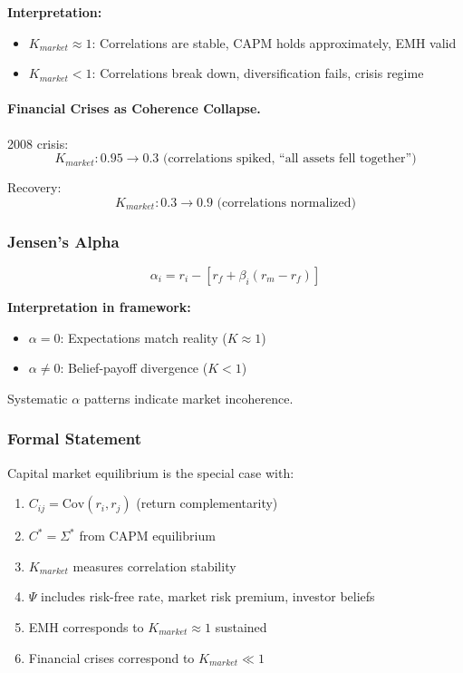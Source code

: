 \textbf{Interpretation:}
\begin{itemize}
  \item $K_{market} \approx 1$: Correlations are stable, CAPM holds approximately, EMH valid
  \item $K_{market} < 1$: Correlations break down, diversification fails, crisis regime
\end{itemize}

\paragraph{Financial Crises as Coherence Collapse.}
2008 crisis:
\begin{equation}
  K_{market} : 0.95 \to 0.3 \text{ (correlations spiked, ``all assets fell together'')}
\end{equation}

Recovery:
\begin{equation}
  K_{market} : 0.3 \to 0.9 \text{ (correlations normalized)}
\end{equation}

\subsubsection{Jensen's Alpha}

\begin{equation}
  \alpha_i = r_i - [r_f + \beta_i(r_m - r_f)]
\end{equation}

\textbf{Interpretation in framework:}
\begin{itemize}
  \item $\alpha = 0$: Expectations match reality ($K \approx 1$)
  \item $\alpha \neq 0$: Belief-payoff divergence ($K < 1$)
\end{itemize}

Systematic $\alpha$ patterns indicate market incoherence.

\subsubsection{Formal Statement}

\begin{proposition}
Capital market equilibrium is the special case with:
\begin{enumerate}
  \item $C_{ij} = \text{Cov}(r_i, r_j)$ (return complementarity)
  \item $C^* = \Sigma^*$ from CAPM equilibrium
  \item $K_{market}$ measures correlation stability
  \item $\Psi$ includes risk-free rate, market risk premium, investor beliefs
  \item EMH corresponds to $K_{market} \approx 1$ sustained
  \item Financial crises correspond to $K_{market} \ll 1$
\end{enumerate}
\end{proposition}

